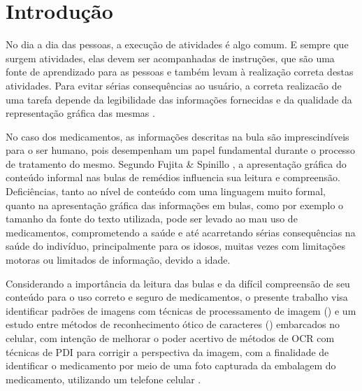 \chapter{Introdução}\label{ch:intro}

No dia a dia das pessoas, a execução de atividades é algo comum. E sempre que surgem atividades, elas devem ser acompanhadas de instruções, que são uma fonte de aprendizado para as pessoas e também levam à realização correta destas atividades. Para evitar sérias consequências ao usuário, a correta realizacão de uma tarefa depende da legibilidade das informações fornecidas e da qualidade da representação gráfica das mesmas \cite{FUJITA2007}.


No caso dos medicamentos, as informações descritas na bula são imprescindíveis para o ser humano, pois desempenham um papel fundamental durante o processo de tratamento do mesmo. Segundo Fujita & Spinillo \cite{FUJITA2006}, a apresentação gráfica do conteúdo informal nas bulas de remédios influencia sua leitura e compreensão. Deficiências, tanto ao nível de conteúdo com uma linguagem muito formal, quanto na apresentação gráfica das informações em bulas, como por exemplo o tamanho da fonte do texto utilizada, pode ser levado ao mau uso de medicamentos, comprometendo a saúde e até acarretando sérias consequências na saúde do indivíduo, principalmente para os idosos, muitas vezes com limitações motoras ou limitados de informação, devido a idade. 


Considerando a importância da leitura das bulas e da difícil compreensão de seu conteúdo para o uso correto e seguro de medicamentos, o presente trabalho visa identificar padrões de imagens com técnicas de processamento de imagem ()  e um estudo entre métodos de reconhecimento ótico de caracteres () embarcados no celular, com intenção de melhorar o poder acertivo de métodos de OCR com técnicas de PDI para corrigir a perspectiva da imagem, com a finalidade de identificar o medicamento por meio de uma foto capturada da embalagem do medicamento, utilizando um telefone celular .



